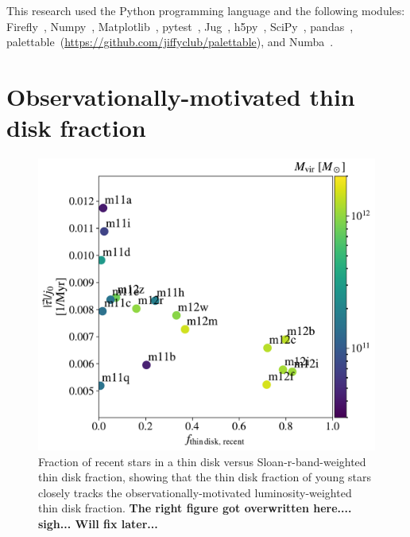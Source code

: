 \documentclass[fleqn,usenatbib]{mnras}
\begin{document}
This research used the Python programming language and the following modules:
Firefly~\citep{Geller2018},
Numpy~\citep{Harris2020},
Matplotlib~\citep{Hunter2007},
pytest~\citep{pytest3.4},
Jug~\citep{Coelho2017},
h5py~\citep{h5py},
SciPy~\citep{Virtanen2020},
pandas~\citep{McKinney2010,Reback2020},
palettable~(\url{https://github.com/jiffyclub/palettable}),
and Numba~\citep{Lam2015}.








\appendix

\section{Observationally-motivated thin disk fraction}
\label{s: appendix-sloan thin disk fraction}

\begin{figure}
    \centering
    \includegraphics[width=\columnwidth]{figures/prevalence/thin_disk_v_thin_disk.pdf}
    \caption{
    Fraction of recent stars in a thin disk versus Sloan-r-band-weighted thin disk fraction, showing that the thin disk fraction of young stars closely tracks the observationally-motivated luminosity-weighted thin disk fraction.
    \textbf{The right figure got overwritten here.... sigh... Will fix later...}
    }
    \label{f: thin disk v thin disk}
\end{figure}
\end{document}
